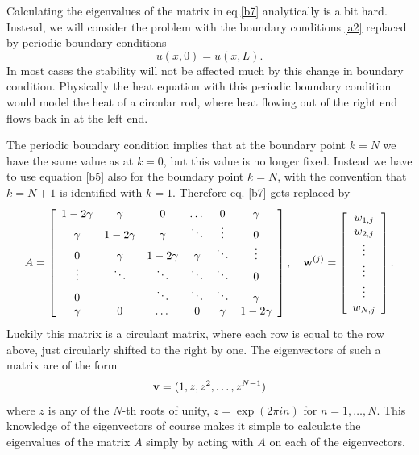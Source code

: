 {{Calculating the eigenvalues of the matrix in eq.\eqref{b7} analytically is a bit hard.
Instead, we will consider the problem with the boundary conditions
\eqref{a2} replaced by periodic boundary conditions
\begin{equation}
u(x,0)=u(x,L).
\end{equation}
In most cases the stability will not be affected much by this change in boundary
condition. Physically the heat equation with this periodic boundary condition 
would model the heat of a circular rod, where heat flowing out of the right
end flows back in at the left end.

The periodic boundary condition implies that at the boundary point
$k=N$ we have the same value as at $k=0$, but this value is no longer fixed.
Instead we have to use equation \eqref{b5} also for the boundary point $k=N$, 
with the convention that $k=N+1$ is identified with $k=1$. Therefore
eq. \eqref{b7} gets replaced by
\begin{equation}
A=\left[
\begin{array}{cccccc}
1-2\gamma &\gamma &0      &\dots  &0 &\gamma \\
\gamma &1-2\gamma &\gamma &\ddots  &\vdots &0\\
0      &\gamma &1-2\gamma &\gamma &\ddots &\vdots \\
\vdots &\ddots &\ddots &\ddots &\ddots &0 \\
0 &       &\ddots &\ddots &\ddots &\gamma \\
\gamma      &0  &\dots  &0      &\gamma &1-2\gamma
\end{array}\right], \quad
{\bf w}^{(j)}=\left[
\begin{array}{c}
w_{1,j} \\
w_{2,j} \\
\vdots \\
\vdots \\
\vdots \\
w_{N,j}
\end{array}\right].
\label{bp7}
\end{equation}
Luckily this matrix is a
circulant matrix, where each row is equal to the row above, just circularly
shifted to the right by one. 
The eigenvectors of such a matrix are of the form
\[{\bf v} = (1,z,z^2,\dots,z^{N-1})\]
where $z$ is any of the $N$-th roots of unity, $z=\exp(2\pi i n)$ for $n=1,\dots,N$. This knowledge of the
eigenvectors of course makes it simple to calculate the eigenvalues
of the matrix $A$ simply by acting with $A$ on each of the eigenvectors.

}}
